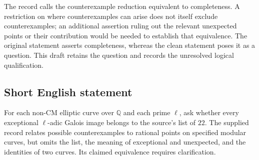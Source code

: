 \documentclass[11pt]{article}
\newcommand{\Q}{\mathbb{Q}}
\begin{document}
The record calls the counterexample reduction equivalent to completeness. A restriction on where counterexamples can arise does not itself exclude counterexamples; an additional assertion ruling out the relevant unexpected points or their contribution would be needed to establish that equivalence. The original statement asserts completeness, whereas the clean statement poses it as a question. This draft retains the question and records the unresolved logical qualification.
\subsection{Short English statement}
For each non-CM elliptic curve over \(\Q\) and each prime \(\ell\), ask whether every exceptional \(\ell\)-adic Galois image belongs to the source's list of \(22\). The supplied record relates possible counterexamples to rational points on specified modular curves, but omits the list, the meaning of exceptional and unexpected, and the identities of two curves. Its claimed equivalence requires clarification.
\end{document}
